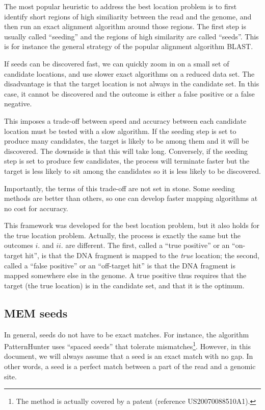 \documentclass{article}
\begin{document}
The most popular heuristic to address the best location problem is to
first identify short regions of high similiarity between the read and the
genome, and then run an exact alignment algorithm around those regions.
The first step is usually called ``seeding'' and the regions of high
similarity are called ``seeds''. This is for instance the general strategy
of the popular alignment algorithm BLAST\cite{pmid2231712}.

If seeds can be discovered fast, we can quickly zoom in on a small set of
candidate locations, and use slower exact algorithms on a reduced data
set. The disadvantage is that the target location is not always in the
candidate set. In this case, it cannot be discovered and the outcome is
either a false positive or a false negative.

This imposes a trade-off between speed and accuracy between each candidate
location must be tested with a slow algorithm. If the seeding step is set
to produce many candidates, the target is likely to be among them and it
will be discovered. The downside is that this will take long. Conversely,
if the seeding step is set to produce few candidates, the process will
terminate faster but the target is less likely to sit among the candidates
so it is less likely to be discovered.

Importantly, the terms of this trade-off are not set in stone. Some
seeding methods are better than others\cite{pmid16533404,pmid20460430}, so
one can develop faster mapping algorithms at no cost for accuracy.

This framework was developed for the best location problem, but it also
holds for the true location problem. Actually, the process is exactly the
same but the outcomes $i.$ and $ii.$ are different. The first, called a
``true positive'' or an ``on-target hit'', is that the DNA fragment is
mapped to the \emph{true} location; the second, called a ``false
positive'' or an ``off-target hit'' is that the DNA fragment is mapped
somewhere else in the genome. A true positive thus requires that the
target (the true location) is in the candidate set, and that it is the
optimum.

\subsection{MEM seeds}

In general, seeds do not have to be exact matches\cite{pmid20460430}. For
instance, the algorithm PatternHunter\cite{pmid11934743} uses ``spaced
seeds'' that tolerate mismatches\footnote{The method is actually covered
by a patent (reference US20070088510A1).}. However, in this document, we
will always assume that a seed is an exact match with no gap. In other
words, a seed is a perfect match between a part of the read and a genomic
site.
\end{document}
